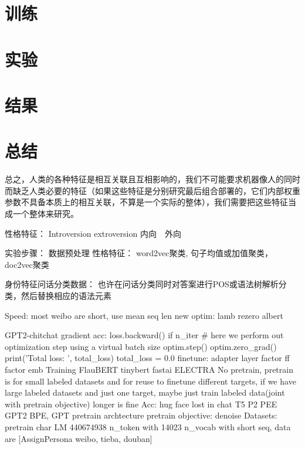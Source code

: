 \documentclass[letterpaper]{article} %
\begin{document}
\begin{CJK*}{UTF8}{gbsn}
\section{训练}

\section{实验}

\section{结果}

\section{总结}

总之，人类的各种特征是相互关联且互相影响的，我们不可能要求机器像人的同时而缺乏人类必要的特征（如果这些特征是分别研究最后组合部署的，它们内部权重参数不具备本质上的相互关联，不算是一个实际的整体），我们需要把这些特征当成一个整体来研究。

性格特征：
Introversion extroversion 
内向　外向

实验步骤：
数据预处理
  性格特征：
    word2vec聚类, 句子均值或加值聚类，doc2vec聚类

  身份特征问话分类数据：
    也许在问话分类同时对答案进行POS或语法树解析分类，然后替换相应的语法元素

  Speed:
      most weibo are short, use mean seq len 
      new optim: lamb
      rezero
      albert 

      GPT2-chitchat
      gradient acc:
         loss.backward() 
         if n_iter %
            # here we perform out optimization step using a virtual batch size
            optim.step()
            optim.zero_grad()
            print('Total loss: ', total_loss)
            total_loss = 0.0
      finetune: adapter layer
      factor ff
      factor emb
      Training FlauBERT
      tinybert
      fastai
      ELECTRA
      No pretrain, pretrain is for small labeled datasets and for reuse to finetune different targets, 
        if we have large labeled datasets and just one target,
        maybe just train labeled data(joint with pretrain objective) longer is fine
  Acc:
      hug face
      lost in chat
      T5
      P2
      PEE
      GPT2 BPE, GPT pretrain
      archtecture
      pretrain objective: denoise
  Datasets:
      pretrain char LM 440674938 n_token with 14023 n_vocab with short seq, data are [AssignPersona weibo, tieba, douban]


\end{CJK*}
\end{document}
